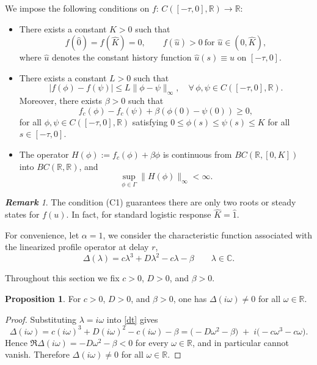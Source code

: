 \documentclass[12pt,letterpaper]{amsart}
\theoremstyle{definition}
\newtheorem{proposition}[theorem]{Proposition}
\theoremstyle{remark}
\newtheorem{remark}[theorem]{{\bf Remark}}
\numberwithin{equation}{section}
\begin{document}
We impose the following conditions on $f:\, C([-\tau,0],\mathbb{R})\to\mathbb{R}$:
\begin{itemize}
	\item[(C1)]  
	There exists a constant $K>0$ such that
	\[
	f(\hat{0}) = f(\hat{K}) = 0, \qquad 
	f(\hat{u}) > 0 \ \text{for } \hat{u}\in(0,\hat{K}),
	\]
	where $\hat{u}$ denotes the constant history function $\hat{u}(s)\equiv u$ on $[-\tau,0]$.
	
	\item[(C2)]  
	There exists a constant $L>0$ such that
	\[
	|f(\phi) - f(\psi)| \le L \|\phi - \psi\|_\infty,
	\quad \forall\, \phi,\psi\in C([-\tau,0],\mathbb{R}).
	\]
	Moreover, there exists $\beta>0$ such that
	\begin{equation}\label{5.4}
		f_c(\phi) - f_c(\psi) + \beta(\phi(0) - \psi(0)) \ge 0,
	\end{equation}
	for all $\phi,\psi \in C([-\tau,0],\mathbb{R})$ satisfying 
	$0 \le \phi(s) \le \psi(s) \le K$ for all $s\in[-\tau,0]$.
	
	\item[(C3)]  
	The operator $H(\phi):=f_c(\phi)+\beta\phi$ is continuous from 
	$BC(\mathbb{R},[0,K])$ into $BC(\mathbb{R},\mathbb{R})$, and 
	\[
	\sup_{\phi\in\Gamma}\|H(\phi)\|_\infty < \infty.
	\]
\end{itemize}
 
 
 \begin{remark}
 	The condition (C1) guarantees there are only two roots or steady states for $f(u).$ In fact, for standard logistic response $\hat{K}=\hat{1}.$ 
 \end{remark}
 
     
For convenience, let $\alpha=1$,  
we consider the characteristic function associated with the linearized profile operator at delay $r$,
\begin{equation} \label{dt}
\Delta (\lambda)=c\lambda^{3}+D\lambda^{2}-c\lambda-\beta 
  \qquad \lambda\in\mathbb{C}.
\end{equation}


Throughout this section we fix $c>0$, $D>0$, and $\beta>0$. 
 \begin{proposition} \label{r0}
	For $c>0$, $D>0$, and $\beta>0$, one has $\Delta(i\omega)\neq 0$ for all $\omega\in\mathbb{R}$.
\end{proposition}


\begin{proof}
	Substituting $\lambda=i\omega$ into \eqref{dt} gives
	$$
	\Delta(i\omega)
	= c(i\omega)^3 + D(i\omega)^2 - c(i\omega) - \beta
	= \big(-D\omega^2 - \beta\big) \;+\; i\big(-c\omega^3 - c\omega\big).
	$$
	Hence $\Re \Delta(i\omega) = -D\omega^2-\beta < 0$ for every $\omega\in\mathbb{R}$, and in particular cannot vanish.
	Therefore $\Delta(i\omega)\neq 0$ for all $\omega\in\mathbb{R}$.
\end{proof}
\end{document}
